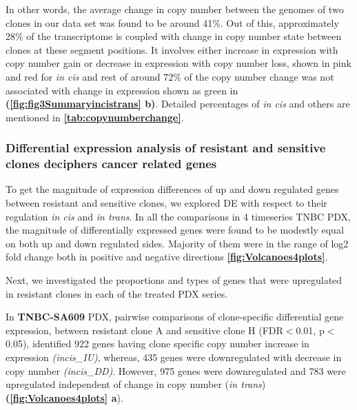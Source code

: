 In other words, the average change in copy number between the genomes of two clones in our data set was found to be around 41\%. Out of this, approximately 28\% of the transcriptome is coupled with change in copy number state between clones at these segment positions. It involves either increase in expression with copy number gain or decrease in expression with copy number loss, shown in pink and red for \textit{in cis} and rest of around 72\% of the copy number change was not associated with change in expression shown as green in \textbf{(\autoref{fig:fig3Summaryincistrans} b)}. Detailed percentages of \textit{in cis} and others are mentioned in \textbf{\autoref{tab:copynumberchange}}.




\subsubsection{Differential expression analysis of resistant and sensitive clones deciphers cancer related genes}
 
 To get the magnitude of expression differences of up and down regulated genes between resistant and sensitive clones, we explored \ac{DE} with respect to their regulation \textit{in cis} and \textit{in trans}. In all the comparisons in 4 timeseries TNBC PDX, the magnitude of differentially expressed genes were found to be modestly equal on both up and down regulated sides. Majority of them were in the range of log2 fold change both in positive and negative directions \textbf{\autoref{fig:Volcanoes4plots}}.
 
 Next, we investigated the proportions and types of genes that were upregulated in resistant clones in each of the treated PDX series.
 
 In \textbf{TNBC-SA609} PDX, pairwise comparisons of clone-specific differential gene expression, between resistant clone A and sensitive clone H (FDR$<$0.01, p$<$0.05), identified 922 genes having clone specific copy number increase in expression \textit{(incis\_IU)}, whereas, 435 genes were downregulated with decrease in copy number \textit{(incis\_DD)}. However, 975 genes were downregulated and 783 were upregulated independent of change in copy number (\textit{in trans}) \textbf{(\autoref{fig:Volcanoes4plots} a}). 
 
